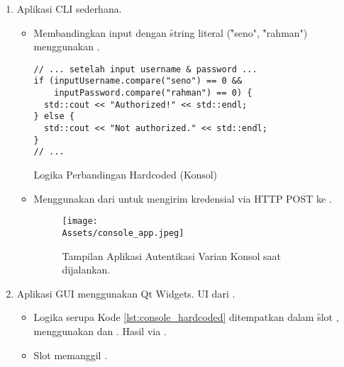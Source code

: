 \begin{enumerate}
	\item {} Aplikasi CLI sederhana.
	      \begin{itemize}
		      \item {} Membandingkan input  dengan \f{string} literal (\f{"seno"}, \f{"rahman"}) menggunakan .
		            \begin{listing}[H] %
			            \begin{verbatim}
// ... setelah input username & password ...
if (inputUsername.compare("seno") == 0 &&
    inputPassword.compare("rahman") == 0) {
  std::cout << "Authorized!" << std::endl;
} else {
  std::cout << "Not authorized." << std::endl;
}
// ...
                    \end{verbatim}
			            \caption{Logika Perbandingan Hardcoded (Konsol)}
			            \label{lst:console_hardcoded}
		            \end{listing}
		      \item {} Menggunakan  dari  untuk mengirim kredensial via HTTP POST ke .
\begin{figure}[H]
	          \centering
	          \texttt{[image: \\Assets/console\_app.jpeg]} %
	          \caption{Tampilan Aplikasi Autentikasi Varian Konsol saat dijalankan.}
	          \label{fig:console_app_ui}
	      \end{figure}
	      \end{itemize}
	\item {} Aplikasi GUI menggunakan Qt Widgets. UI dari .
	      \begin{itemize}
		      \item {} Logika serupa Kode \ref{lst:console_hardcoded} ditempatkan dalam \f{slot} , menggunakan  dan . Hasil via .
		      \item {} Slot memanggil .

\end{itemize}
\end{enumerate}
